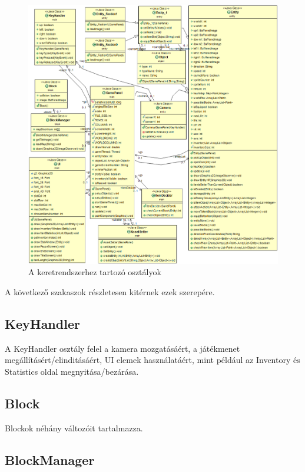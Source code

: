 \begin{figure}[!ht]
    \centering
    \includegraphics[width=\textwidth]{images/UML.png}
    \caption{A keretrendszerhez tartozó osztályok}
    \label{fig:UML}
\end{figure}

\noindent A következő szakaszok részletesen kitérnek ezek szerepére.

\subsection{KeyHandler}

A KeyHandler osztály felel a kamera mozgatásáért, a játékmenet megállításért/elinditásáért, UI elemek használatáért, 
mint például az Inventory és Statistics oldal megnyitása/bezárása.

\subsection{Block}

Blockok néhány változóit tartalmazza.

\subsection{BlockManager}

